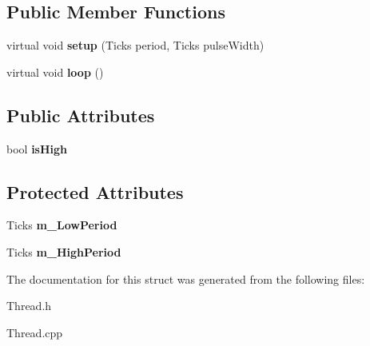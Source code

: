 \subsection*{Public Member Functions}
\begin{DoxyCompactItemize}
\item 
\hypertarget{structfirestep_1_1_pulse_thread_a818deb02f6bf4d8e646e9ca9ed1d1305}{virtual void {\bfseries setup} (Ticks period, Ticks pulse\+Width)}\label{structfirestep_1_1_pulse_thread_a818deb02f6bf4d8e646e9ca9ed1d1305}

\item 
\hypertarget{structfirestep_1_1_pulse_thread_acfca17547b41025ac398c4217558604c}{virtual void {\bfseries loop} ()}\label{structfirestep_1_1_pulse_thread_acfca17547b41025ac398c4217558604c}

\end{DoxyCompactItemize}
\subsection*{Public Attributes}
\begin{DoxyCompactItemize}
\item 
\hypertarget{structfirestep_1_1_pulse_thread_a28811f78e9b136829a192389dc0f941f}{bool {\bfseries is\+High}}\label{structfirestep_1_1_pulse_thread_a28811f78e9b136829a192389dc0f941f}

\end{DoxyCompactItemize}
\subsection*{Protected Attributes}
\begin{DoxyCompactItemize}
\item 
\hypertarget{structfirestep_1_1_pulse_thread_ade79afaef23c6cdc7bb12e77e148bd5b}{Ticks {\bfseries m\+\_\+\+Low\+Period}}\label{structfirestep_1_1_pulse_thread_ade79afaef23c6cdc7bb12e77e148bd5b}

\item 
\hypertarget{structfirestep_1_1_pulse_thread_a3b0898a4a995c26f6324f0996f01df83}{Ticks {\bfseries m\+\_\+\+High\+Period}}\label{structfirestep_1_1_pulse_thread_a3b0898a4a995c26f6324f0996f01df83}

\end{DoxyCompactItemize}


The documentation for this struct was generated from the following files\+:\begin{DoxyCompactItemize}
\item 
Thread.\+h\item 
Thread.\+cpp\end{DoxyCompactItemize}
